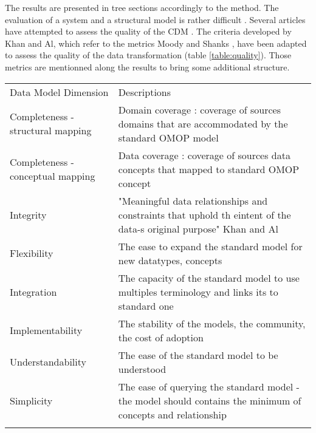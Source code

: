 
The results are presented in tree sections accordingly to the method. The
evaluation of a system and a structural model is rather difficult
\cite{moody-quality}. Several articles have attempted to assess the quality of
the CDM \cite{kahn_data_2012,omop-vs-pcornet}. The criteria developed by Khan
and Al\cite{khan-quality}, which refer to the metrics Moody and Shanks
\cite{moody-quality}, have been adapted to assess the quality of the data
transformation (table \ref{table:quality}). Those metrics are mentionned along
the results to bring some additional structure.

\tiny
\begin{table*}[t]
\caption{Data Transformation Quality Evaluation Metrics}
\begin{tabular}{@{}ll@{}}\toprule
Data Model Dimension              & Descriptions                                                                                                      \\\colrule
Completeness - structural mapping & Domain coverage : coverage of sources domains that are accommodated by the standard OMOP model                    \\
Completeness - conceptual mapping & Data coverage : coverage of sources data concepts that mapped to standard OMOP concept                            \\
Integrity                         & "Meaningful data relationships and constraints that uphold th eintent of the data-s original purpose" Khan and Al \\
Flexibility                       & The ease to expand the standard model for new datatypes, concepts                                                 \\
Integration                       & The capacity of the standard model to use multiples terminology and links its to standard one                     \\
Implementability                  & The stability of the models, the community, the cost of adoption                                                  \\
Understandability                 & The ease of the standard model to be understood                                                           	      \\
Simplicity                        & The ease of querying the standard model - the model should contains the minimum of concepts and relationship      \\\botrule 
\end{tabular}
\label{table:quality}
\end{table*}
\normalsize

